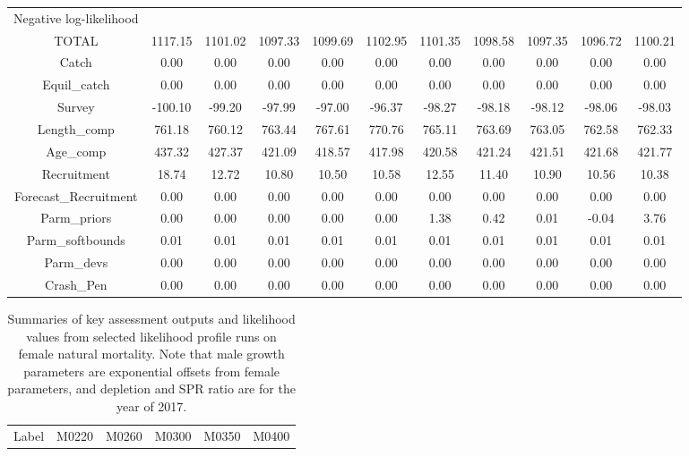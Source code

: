 \documentclass[12pt,]{article}
\begin{document}
\begin{landscape}
\begin{table}[ht]
\begin{tabular}{c|ccccc|ccccc}
  Negative log-likelihood &  &  &  &  &  &  &  &  &  &  \\ 
  TOTAL & 1117.15 & 1101.02 & 1097.33 & 1099.69 & 1102.95 & 1101.35 & 1098.58 & 1097.35 & 1096.72 & 1100.21 \\ 
  Catch & 0.00 & 0.00 & 0.00 & 0.00 & 0.00 & 0.00 & 0.00 & 0.00 & 0.00 & 0.00 \\ 
  Equil\_catch & 0.00 & 0.00 & 0.00 & 0.00 & 0.00 & 0.00 & 0.00 & 0.00 & 0.00 & 0.00 \\ 
  Survey & -100.10 & -99.20 & -97.99 & -97.00 & -96.37 & -98.27 & -98.18 & -98.12 & -98.06 & -98.03 \\ 
  Length\_comp & 761.18 & 760.12 & 763.44 & 767.61 & 770.76 & 765.11 & 763.69 & 763.05 & 762.58 & 762.33 \\ 
  Age\_comp & 437.32 & 427.37 & 421.09 & 418.57 & 417.98 & 420.58 & 421.24 & 421.51 & 421.68 & 421.77 \\ 
  Recruitment & 18.74 & 12.72 & 10.80 & 10.50 & 10.58 & 12.55 & 11.40 & 10.90 & 10.56 & 10.38 \\ 
  Forecast\_Recruitment & 0.00 & 0.00 & 0.00 & 0.00 & 0.00 & 0.00 & 0.00 & 0.00 & 0.00 & 0.00 \\ 
  Parm\_priors & 0.00 & 0.00 & 0.00 & 0.00 & 0.00 & 1.38 & 0.42 & 0.01 & -0.04 & 3.76 \\ 
  Parm\_softbounds & 0.01 & 0.01 & 0.01 & 0.01 & 0.01 & 0.01 & 0.01 & 0.01 & 0.01 & 0.01 \\ 
  Parm\_devs & 0.00 & 0.00 & 0.00 & 0.00 & 0.00 & 0.00 & 0.00 & 0.00 & 0.00 & 0.00 \\ 
  Crash\_Pen & 0.00 & 0.00 & 0.00 & 0.00 & 0.00 & 0.00 & 0.00 & 0.00 & 0.00 & 0.00 \\ 
   \hline
\end{tabular}
\end{table}
\begin{table}[ht]
\centering
\caption{Summaries of key assessment outputs 
                                              and likelihood values from selected 
                                              likelihood profile runs on female 
                                              natural mortality.  Note that male 
                                              growth parameters are exponential 
                                              offsets from female parameters, and 
                                              depletion and SPR ratio are for the year of 2017.} 
\label{tab:like_profiles}
\begin{tabular}{c|ccccc}
  \hline
Label & M0220 & M0260 & M0300 & M0350 & M0400 \\ 

\end{tabular}
\end{table}
\end{landscape}
\end{document}
